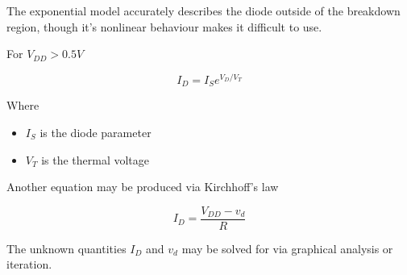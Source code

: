 \documentclass[../notes.tex]{subfiles}
\begin{document}
The exponential model accurately describes the diode outside of the breakdown region, though it's nonlinear behaviour makes it difficult to use.

For $ V_{DD} > 0.5V $

\begin{equation}
	I_D = I_S e^{V_D/V_T}
	\label{eq:360:forward_conducting_diode}
\end{equation}

Where 
\begin{itemize}
	\item $ I_S $ is the diode parameter
	\item $ V_T $ is the thermal voltage
\end{itemize}

Another equation may be produced via Kirchhoff's law

\begin{equation}
I_D = \frac{V_{DD} - v_d}{R}
 \label{eq:360:forward_conducting_diode_kirchhoff}
\end{equation}



The unknown quantities $ I_D $ and $ v_d $ may be solved for via graphical analysis or iteration.
\end{document}
